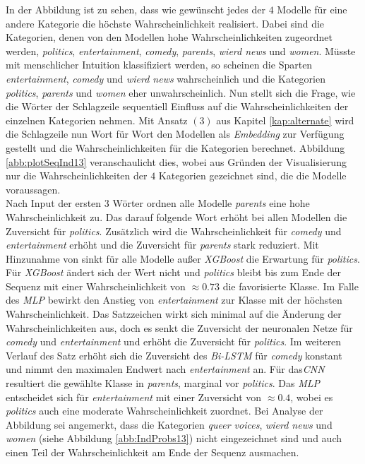 \documentclass[a4paper,11pt]{article}
\begin{document}
In der Abbildung ist zu sehen, dass wie gewünscht jedes der $4$ Modelle für eine andere Kategorie die höchste Wahrscheinlichkeit realisiert. Dabei sind die Kategorien, denen von den Modellen hohe Wahrscheinlichkeiten zugeordnet werden, \textit{politics}, \textit{entertainment}, \textit{comedy}, \textit{parents}, \textit{wierd news} und \textit{women}. Müsste mit menschlicher Intuition klassifiziert werden, so scheinen die Sparten \textit{entertainment}, \textit{comedy} und \textit{wierd news} wahrscheinlich und die Kategorien \textit{politics}, \textit{parents} und \textit{women} eher unwahrscheinlich. Nun stellt sich die Frage, wie die Wörter der Schlagzeile sequentiell Einfluss auf die Wahrscheinlichkeiten der einzelnen Kategorien nehmen. Mit Ansatz $(3)$ aus Kapitel \ref{kap:alternate} wird die Schlagzeile nun Wort für Wort den Modellen als \textit{Embedding} zur Verfügung gestellt und die Wahrscheinlichkeiten für die Kategorien berechnet. Abbildung \ref{abb:plotSeqInd13} veranschaulicht dies, wobei aus Gründen der Visualisierung nur die Wahrscheinlichkeiten der $4$ Kategorien gezeichnet sind, die die Modelle voraussagen.\\
Nach Input der ersten $3$ Wörter  ordnen alle Modelle \textit{parents} eine hohe Wahrscheinlichkeit zu. Das darauf folgende Wort  erhöht bei allen Modellen die Zuversicht für \textit{politics}. Zusätzlich wird die Wahrscheinlichkeit für \textit{comedy} und \textit{entertainment} erhöht und die Zuversicht für \textit{parents} stark reduziert. Mit Hinzunahme von  sinkt für alle Modelle außer \textit{XGBoost} die Erwartung für \textit{politics}. Für \textit{XGBoost} ändert sich der Wert nicht und \textit{politics} bleibt bis zum Ende der Sequenz mit einer Wahrscheinlichkeit von $\approx 0.73$ die favorisierte Klasse. Im Falle des \textit{MLP} bewirkt  den Anstieg von \textit{entertainment} zur Klasse mit der höchsten Wahrscheinlichkeit. Das Satzzeichen \say{\textit{,}} wirkt sich minimal auf die Änderung der Wahrscheinlichkeiten aus, doch es senkt die Zuversicht der neuronalen Netze für \textit{comedy} und \textit{entertainment} und erhöht die Zuversicht für \textit{politics}. Im weiteren Verlauf des Satz erhöht sich die Zuversicht des \textit{Bi-LSTM} für \textit{comedy} konstant und nimmt den maximalen Endwert nach \textit{entertainment} an. Für das\textit{CNN} resultiert die gewählte Klasse in \textit{parents}, marginal vor \textit{politics}. Das \textit{MLP} entscheidet sich für \textit{entertainment} mit einer Zuversicht von $\approx 0.4$, wobei es \textit{politics} auch eine moderate Wahrscheinlichkeit zuordnet. Bei Analyse der Abbildung sei angemerkt, dass die Kategorien \textit{queer voices}, \textit{wierd news} und \textit{women} (siehe Abbildung \ref{abb:IndProbs13}) nicht eingezeichnet sind und auch einen Teil der Wahrscheinlichkeit am Ende der Sequenz ausmachen.\\
\end{document}
